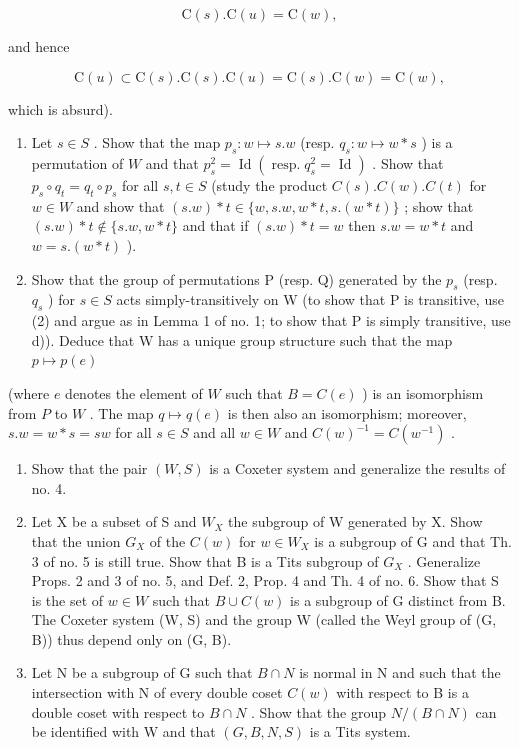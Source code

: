 \[
\mathrm{C} (s). \mathrm{C} (u) = \mathrm{C} (w),
\]

and hence

\[
\mathrm{C} (u) \subset \mathrm{C} (s). \mathrm{C} (s). \mathrm{C} (u) = \mathrm{C} (s). \mathrm{C} (w) = \mathrm{C} (w),
\]

which is absurd).

\begin{enumerate}
\def\labelenumi{\alph{enumi})}
\setcounter{enumi}{3}
\item
  Let \(s \in S\) . Show that the map \(p_s: w \mapsto s.w\) (resp. \(q_s: w \mapsto w * s\) ) is a permutation of \(W\) and that \(p_s^2 = \operatorname{Id}(\operatorname{resp.} q_s^2 = \operatorname{Id})\) . Show that \(p_s \circ q_t = q_t \circ p_s\) for all \(s, t \in S\) (study the product \(C(s).C(w).C(t)\) for \(w \in W\) and show that \((s.w) * t \in \{w, s.w, w * t, s.(w * t)\}\) ; show that \((s.w) * t \notin \{s.w, w * t\}\) and that if \((s.w) * t = w\) then \(s.w = w * t\) and \(w = s.(w * t)\) ).
\item
  Show that the group of permutations P (resp. Q) generated by the \(p_{s}\) (resp. \(q_{s}\) ) for \(s \in S\) acts simply-transitively on W (to show that P is transitive, use (2) and argue as in Lemma 1 of no. 1; to show that P is simply transitive, use d)). Deduce that W has a unique group structure such that the map \(p \mapsto p(e)\)
\end{enumerate}

(where \(e\) denotes the element of \(W\) such that \(B = C(e)\) ) is an isomorphism from \(P\) to \(W\) . The map \(q \mapsto q(e)\) is then also an isomorphism; moreover, \(s.w = w * s = sw\) for all \(s \in S\) and all \(w \in W\) and \(C(w)^{-1} = C(w^{-1})\) .

\begin{enumerate}
\def\labelenumi{\alph{enumi})}
\setcounter{enumi}{5}
\item
  Show that the pair \((W,S)\) is a Coxeter system and generalize the results of no. 4.
\item
  Let X be a subset of S and \(W_{X}\) the subgroup of W generated by X. Show that the union \(G_{X}\) of the \(C(w)\) for \(w \in W_{X}\) is a subgroup of G and that Th. 3 of no. 5 is still true. Show that B is a Tits subgroup of \(G_{X}\) . Generalize Props. 2 and 3 of no. 5, and Def. 2, Prop. 4 and Th. 4 of no. 6. Show that S is the set of \(w \in W\) such that \(B \cup C(w)\) is a subgroup of G distinct from B. The Coxeter system (W, S) and the group W (called the Weyl group of (G, B)) thus depend only on (G, B).
\item
  Let N be a subgroup of G such that \(B \cap N\) is normal in N and such that the intersection with N of every double coset \(C(w)\) with respect to B is a double coset with respect to \(B \cap N\) . Show that the group \(N/(B \cap N)\) can be identified with W and that \((G, B, N, S)\) is a Tits system.
\end{enumerate}

